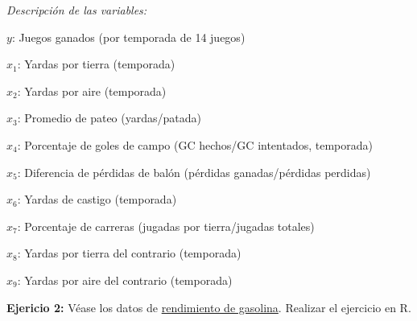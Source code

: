 \documentclass[
]{book}
\begin{document}
\emph{Descripción de las variables:}

\(y\): Juegos ganados (por temporada de 14 juegos)

\(x_{1}\): Yardas por tierra (temporada)

\(x_{2}\): Yardas por aire (temporada)

\(x_{3}\): Promedio de pateo (yardas/patada)

\(x_{4}\): Porcentaje de goles de campo (GC hechos/GC intentados, temporada)

\(x_{5}\): Diferencia de pérdidas de balón (pérdidas ganadas/pérdidas perdidas)

\(x_{6}\): Yardas de castigo (temporada)

\(x_{7}\): Porcentaje de carreras (jugadas por tierra/jugadas totales)

\(x_{8}\): Yardas por tierra del contrario (temporada)

\(x_{9}\): Yardas por aire del contrario (temporada)

\textbf{Ejericio 2:} Véase los datos de \href{https://github.com/HaydeePeruyero/MultivariateStatisticalAnalysis/tree/main/data/Rendimiento_de_gasolina.csv}{rendimiento de gasolina}. Realizar el ejercicio en R.
\end{document}
